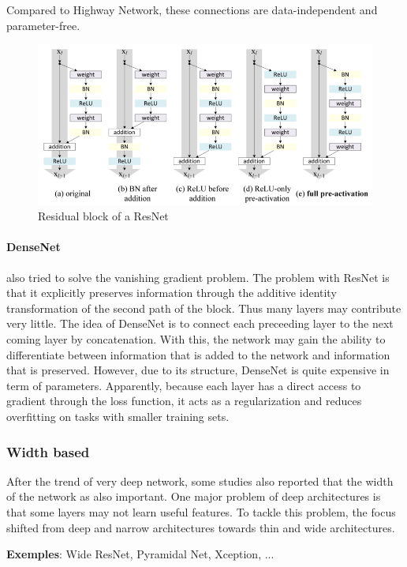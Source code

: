 Compared to Highway Network, these connections are data-independent and parameter-free.

\begin{figure}[H]
    \centering
    \includegraphics[scale=0.3]{content/resnet.png}
    \caption{Residual block of a ResNet}
    \label{fig:resnet}
\end{figure}

\paragraph{DenseNet}
also tried to solve the vanishing gradient problem. The problem with ResNet is that it explicitly preserves information through the additive identity transformation of the second path of the block. Thus many layers may contribute very little. The idea of DenseNet is to connect each preceeding layer to the next coming layer by concatenation. With this, the network may gain the ability to differentiate between information that is added to the network and information that is preserved. However, due to its structure, DenseNet is quite expensive in term of parameters. 
Apparently, because each layer has a direct access to gradient through the loss function, it acts as a regularization and reduces overfitting on tasks with smaller training sets.


\subsubsection{Width based}
After the trend of very deep network, some studies also reported that the width of the network as also important. One major problem of deep architectures is that some layers may not learn useful features. To tackle this problem, the focus shifted from deep and narrow architectures towards thin and wide architectures.

\textbf{Exemples}: Wide ResNet, Pyramidal Net, Xception, ...


